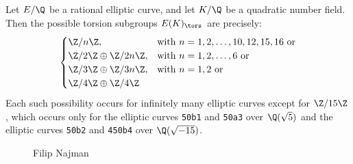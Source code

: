 
\begin{frame}[plain]
\footnotesize
\begin{thm}[Najman, 2015]
Let $E/\Q$ be a rational elliptic curve, and let $K/\Q$ be a quadratic number field. Then the possible torsion subgroups $E(K)_\tors$ are precisely:
	\[
	\begin{cases}
	\Z/n\Z, & \text{with } n= 1, 2, \ldots, 10, 12, 15, 16 \text{ or} \\
	\Z/2\Z \oplus \Z/2n\Z, & \text{with } n= 1, 2, \ldots, 6 \text{ or} \\
	\Z/3\Z \oplus \Z/3n\Z, & \text{with } n= 1, 2 \text{ or} \\
	\Z/4\Z \oplus \Z/4\Z
	\end{cases}
	\]
Each such possibility occurs for infinitely many elliptic curves except for $\Z/15\Z$, which occurs only for the elliptic curves \texttt{50b1} and \texttt{50a3} over $\Q(\sqrt{5})$ and the elliptic curves \texttt{50b2} and \texttt{450b4} over $\Q(\sqrt{-15})$. 
\end{thm}
	\begin{figure}[!ht]
	\centering
	\captionsetup{labelformat=empty}
	\caption{Filip Najman}
	\end{figure}
\end{frame}



